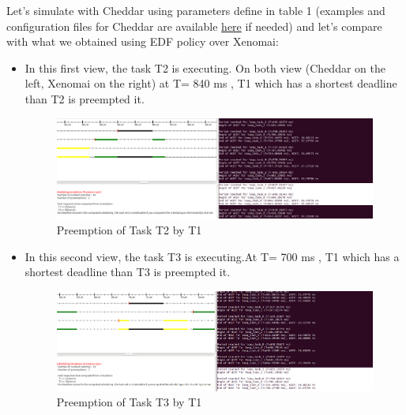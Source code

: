 \documentclass[12pt,hidelinks]{article}
\begin{document}
{        Let's simulate with Cheddar using parameters define in table 1 (examples and configuration files for Cheddar are available \href{https://github.com/skyultime/M2_ERTS_Project_xenomai_edh/tree/main/Tests/EDFonXenomai/EDF_Problem}{here} if needed) and let's compare with what we obtained using EDF policy over Xenomai:

        \newpage
        \begin{itemize}
            \item In this first view, the task T2 is executing. On both view (Cheddar on the left, Xenomai on the right) at T= 840 ms , T1 which has a shortest deadline than T2 is preempted it.
            
            \begin{figure}[h]
                \hspace*{-2cm}   
                \centering
                \includegraphics[scale=0.4]{T1overT2.png}
                \caption{Preemption of Task T2 by T1}
        	\end{figure} \newline
            
            \item In this second view, the task T3 is executing.At T= 700 ms , T1 which has a shortest deadline than T3 is preempted it.
            
            \begin{figure}[h]
                \hspace*{-2cm}  
                \centering
                \includegraphics[scale=0.4]{T1overT3.png}
                \caption{Preemption of Task T3 by T1}
        	\end{figure} \newline
            

\end{itemize}}
\end{document}
